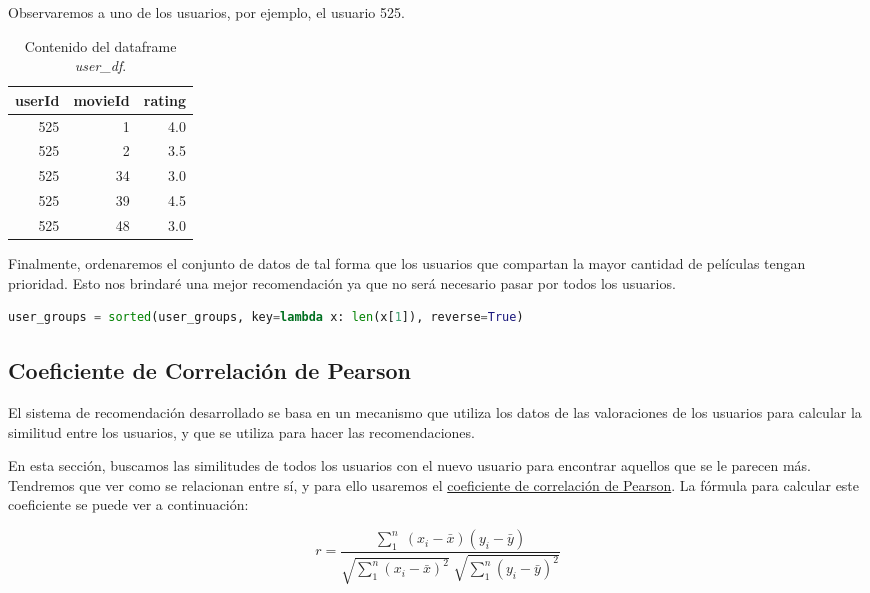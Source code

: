 \documentclass{uimppracticas}
\begin{document}
Observaremos a uno de los usuarios, por ejemplo, el usuario 525.

\begin{table}[h]
	\centering
	\begin{tabular}{rrr}
		\toprule
		userId &  movieId &  rating \\
		\midrule
		525 &        1 &     4.0 \\
		525 &        2 &     3.5 \\
		525 &       34 &     3.0 \\
		525 &       39 &     4.5 \\
		525 &       48 &     3.0 \\
		\bottomrule
	\end{tabular}
	\caption{Contenido del dataframe \textit{user\_df}.}
	\label{user_525}
\end{table}

Finalmente, ordenaremos el conjunto de datos de tal forma que los usuarios que compartan la mayor cantidad de películas tengan prioridad. Esto nos brindaré una mejor recomendación ya que no será necesario pasar por todos los usuarios. 

\begin{lstlisting}[language=python]
user_groups = sorted(user_groups, key=lambda x: len(x[1]), reverse=True)
\end{lstlisting}

\subsection{Coeficiente de Correlación de Pearson}\label{correlacion_pearson}

El sistema de recomendación desarrollado se basa en un mecanismo que utiliza los datos de las valoraciones de los usuarios para calcular la similitud entre los usuarios, y que se utiliza para hacer las recomendaciones.

En esta sección, buscamos las similitudes de todos los usuarios con el nuevo usuario para encontrar aquellos que se le parecen más. Tendremos que ver como se relacionan entre sí, y para ello usaremos el \href{https://es.wikipedia.org/wiki/Coeficiente_de_correlaci\%C3\%B3n_de_Pearson}{coeficiente de correlación de Pearson}. La fórmula para calcular este coeficiente se puede ver a continuación:

\begin{equation}\label{formula}
	r = \frac{\sum_{1}^{n} \; (x_{i} - \bar{x}) (y_{i} - \bar{y})}{\sqrt{\sum_{1}^{n}(x_{i} - \bar{x})^2} \; \sqrt{\sum_{1}^{n}(y_{i} - \bar{y})^2}}
\end{equation}
\end{document}
